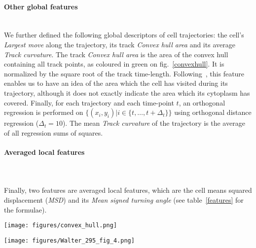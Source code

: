 
\paragraph{Other global features}~\\
We further defined the following global descriptors of cell
trajectories: the cell's \textit{Largest move} along the trajectory, its track
\textit{Convex hull area} and its average \textit{Track
  curvature}. The track \textit{Convex hull area} is the area of the
convex hull containing all track points, as coloured in green on
fig.~\ref{convexhull}. It is normalized by the square root of the
track time-length. Following~\cite{pmid18213366}, this feature enables
us to have an idea of the area which the cell has visited during its
trajectory, although it does not exactly indicate the area which its
cytoplasm has covered. Finally, for each trajectory and each time-point $t$, an orthogonal regression is performed on $\{(x_i, y_i) | i \in \{t,\ldots, t+\Delta_t\} \}$ using orthogonal distance regression ($\Delta_t=10$). The mean \textit{Track curvature} of the trajectory is the average of all regression sums of squares. 
\paragraph{Averaged local features}~\\\\
Finally, two features are averaged local features, which are the cell
means squared displacement
(\textit{MSD}) and its \textit{Mean signed turning angle} (see table~\ref{features} for the formulae). 
\begin{figure*}[!ht]%
\centerline{\texttt{[image: figures/convex\_hull.png]}}
\caption{Convex hull of the example track from figure~\ref{fig:01}}
\label{convexhull}
\end{figure*}
\begin{figure*}[!tpb]%
\centerline{\texttt{[image: figures/Walter\_295\_fig\_4.png]}}
\caption{Heatmap showing trajectory feature similarities on a subset of the Mitocheck dataset (1.1 million trajectories coming from detected motility hit experiments according to MotIW). The dengrograms were obtained using the \textit{Ward} method and the euclidean distance between feature correlations.}\label{correlations}
\end{figure*}
